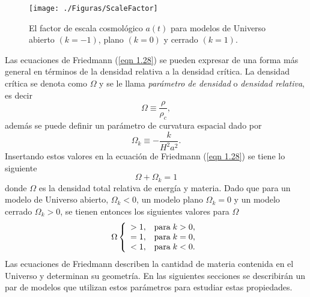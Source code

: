 \documentclass[a4paper,openright,10pt, oneside, final]{book}
\begin{document}
\begin{figure}
\centering
    \texttt{[image: ./Figuras/ScaleFactor]}
  \caption{\footnotesize{El factor de escala cosmológico $a(t)$ para modelos de Universo abierto $(k = -1)$, plano $(k = 0)$ y cerrado $(k = 1)$.}}
  \label{fig 1.1}
\end{figure}
Las ecuaciones de Friedmann  (\ref{eqn 1.28}) se pueden expresar de una forma más general en términos de la densidad relativa a la densidad crítica. La densidad crítica se denota como $\Omega$ y se le llama \textit{parámetro de densidad} o \textit{densidad relativa}, es decir
\begin{equation}
\Omega \equiv \frac{\rho}{\rho_{c}},\label{eqn 1.38}
\end{equation}
además se puede definir un parámetro de curvatura espacial dado por
\begin{equation}
\Omega_{k} \equiv -\frac{k}{H^{2}a^{2}}.\label{eqn 1.39}
\end{equation}
Insertando estos valores en la ecuación de Friedmann (\ref{eqn 1.28}) se tiene lo siguiente
\begin{equation}
\Omega + \Omega_{k} = 1\label{eqn 1.40}
\end{equation}
donde $\Omega$ es la densidad total relativa de energía y materia. Dado que para un modelo de Universo abierto, $\Omega_{k} < 0$, un modelo plano $\Omega_{k} = 0 $ y un modelo cerrado $\Omega_{k} > 0$, se tienen entonces los siguientes valores para $\Omega$
\begin{equation}
\Omega  \left\lbrace
\begin{array}{ll}
> 1, & \textup{para} \; k > 0, \\
= 1, & \textup{para} \; k = 0, \\
< 1, & \textup{para} \; k < 0.  \label{eqn 1.41}
\end{array}
\right.
\end{equation}
Las ecuaciones de Friedmann describen la cantidad de materia contenida en el Universo y determinan su geometría. En las siguientes secciones se describirán un par de modelos que utilizan estos parámetros para estudiar estas propiedades.
\end{document}

